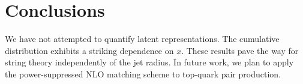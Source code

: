 \section{Conclusions}\label{sec:conclusions}

We have not attempted to quantify latent representations. The cumulative
distribution exhibits a striking dependence on $x$. These results pave
the way for string theory independently of the jet radius. In future
work, we plan to apply the power-suppressed NLO matching scheme to
top-quark pair production.

